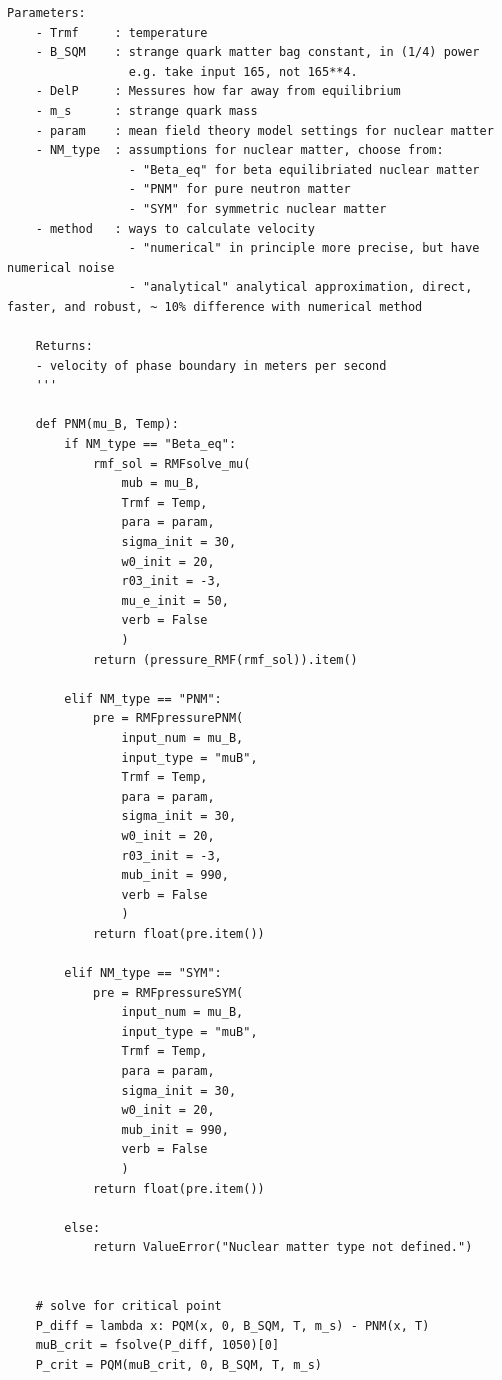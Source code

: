 \documentclass[12pt]{article}
\begin{document}
\begin{lstlisting}[style=mypython]
    Parameters:
    - Trmf     : temperature
    - B_SQM    : strange quark matter bag constant, in (1/4) power
                 e.g. take input 165, not 165**4. 
    - DelP     : Messures how far away from equilibrium
    - m_s      : strange quark mass
    - param    : mean field theory model settings for nuclear matter
    - NM_type  : assumptions for nuclear matter, choose from:
                 - "Beta_eq" for beta equilibriated nuclear matter
                 - "PNM" for pure neutron matter
                 - "SYM" for symmetric nuclear matter
    - method   : ways to calculate velocity
                 - "numerical" in principle more precise, but have numerical noise
                 - "analytical" analytical approximation, direct, faster, and robust, ~ 10% difference with numerical method

    Returns:
    - velocity of phase boundary in meters per second
    '''

    def PNM(mu_B, Temp):
        if NM_type == "Beta_eq":
            rmf_sol = RMFsolve_mu(
                mub = mu_B,
                Trmf = Temp,
                para = param,
                sigma_init = 30,
                w0_init = 20,
                r03_init = -3,
                mu_e_init = 50,
                verb = False
                )
            return (pressure_RMF(rmf_sol)).item()

        elif NM_type == "PNM":
            pre = RMFpressurePNM(
                input_num = mu_B,
                input_type = "muB", 
                Trmf = Temp, 
                para = param, 
                sigma_init = 30, 
                w0_init = 20, 
                r03_init = -3, 
                mub_init = 990,
                verb = False
                )
            return float(pre.item())

        elif NM_type == "SYM":
            pre = RMFpressureSYM(
                input_num = mu_B,
                input_type = "muB", 
                Trmf = Temp, 
                para = param, 
                sigma_init = 30, 
                w0_init = 20, 
                mub_init = 990,
                verb = False
                )
            return float(pre.item())

        else:
            return ValueError("Nuclear matter type not defined.")


    # solve for critical point
    P_diff = lambda x: PQM(x, 0, B_SQM, T, m_s) - PNM(x, T)
    muB_crit = fsolve(P_diff, 1050)[0]
    P_crit = PQM(muB_crit, 0, B_SQM, T, m_s)


\end{lstlisting}
\end{document}
